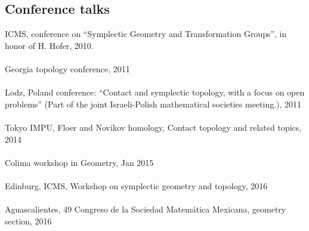 \documentclass[overlapped,line,letterpaper]{res}
\begin{document}
\begin{resume}
\section {\sc Conference talks}
ICMS, conference on ``Symplectic Geometry and Transformation Groups'', in honor
of H. Hofer, 2010. \\\\
Georgia topology conference, 2011 \\\\
Lodz, Poland conference: ``Contact and symplectic topology, with a focus on open
problems'' (Part of the joint Israeli-Polish mathematical societies meeting.), 2011 \\\\
Tokyo IMPU, Floer and Novikov homology, Contact topology and related topics, 2014 \\\\
% 
Colima workshop in Geometry, Jan 2015  \\\\
Edinburg, ICMS, Workshop on symplectic geometry and topology, 2016 \\\\
Aguascalientes, 49 Congreso de la Sociedad Matemática Mexicana, geometry section, 2016 \\\\

\end{resume}
\end{document}
